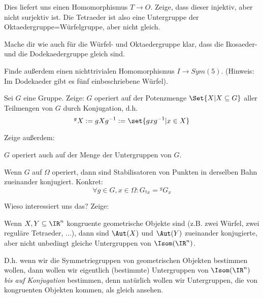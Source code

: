 \begin{sheet}
\begin{problem}[title={Gruppenhomomorphismen}]
\begin{subproblem}

Dies liefert uns einen Homomorphismus $T\to O$. Zeige, dass dieser injektiv, aber nicht surjektiv ist. Die Tetraeder ist also eine Untergruppe der Oktaedergruppe=Würfelgruppe, aber nicht gleich.
\end{subproblem}

\begin{subproblem}[difficulty={mittel bis schwer}]
Mache dir wie auch für die Würfel- und Oktaedergruppe klar, dass die Ikosaeder- und die Dodekaedergruppe gleich sind.

Finde außerdem einen nichttrivialen Homomorphismus $I\to Sym(5)$. (Hinweis: Im Dodekaeder gibt es fünf einbeschriebene Würfel).
\end{subproblem}
\end{problem}


\begin{problem}[title={Operation auf Teilmengen durch Konjugation}]
Sei $G$ eine Gruppe. Zeige: $G$ operiert auf der Potenzmenge $\Set{X | X\subseteq G}$ aller Teilmengen von $G$ durch Konjugation, d.h.
\[{^g X} := gXg^{-1} := \set{gxg^{-1} | x\in X}\]

Zeige außerdem:
\begin{subproblem}
$G$ operiert auch auf der Menge der Untergruppen von $G$.
\end{subproblem}
\begin{subproblem}
Wenn $G$ auf $\Omega$ operiert, dann sind Stabilisatoren von Punkten in derselben Bahn zueinander konjugiert. Konkret:
\[\forall g\in G, x\in\Omega: G_{^g x} = {^g G_x}\]
\end{subproblem}

Wieso interessiert uns das? Zeige:
\begin{subproblem}
Wenn $X,Y\subseteq\IR^n$ kongruente geometrische Objekte sind (z.B. zwei Würfel, zwei reguläre Tetraeder, ...), dann sind $\Aut(X)$ und $\Aut(Y)$ zueinander konjugierte, aber nicht unbedingt gleiche Untergruppen von $\Isom(\IR^n)$.
\end{subproblem}
D.h. wenn wir die Symmetriegruppen von geometrischen Objekten bestimmen wollen, dann wollen wir eigentlich (bestimmte) Untergruppen von $\Isom(\IR^n)$ \emph{bis auf Konjugation} bestimmen, denn natürlich wollen wir Untergruppen, die von kongruenten Objekten kommen, als gleich ansehen.
\end{problem}



\end{sheet}
